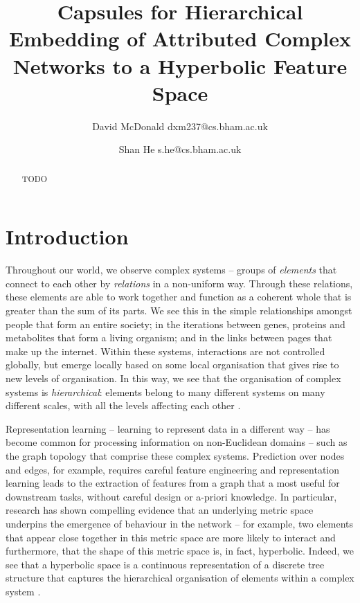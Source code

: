 \documentclass{IEEEtran}
\title{Capsules for Hierarchical Embedding of Attributed Complex Networks to a Hyperbolic Feature Space}
\author{David McDonald dxm237@cs.bham.ac.uk \and Shan He s.he@cs.bham.ac.uk}
\date{}
\begin{document}
	
	\maketitle
	
	\begin{abstract}
		TODO
	\end{abstract}
	
	\section{Introduction}
	
	Throughout our world, we observe complex systems -- groups of \textit{elements} that connect to each other by \textit{relations} in a non-uniform way. 
	Through these relations, these elements are able to work together and function as a coherent whole that is greater than the sum of its parts.
	We see this in the simple relationships amongst people that form an entire society; in the iterations between genes, proteins and metabolites that form a living organism; and in the links between pages that make up the internet.
	Within these systems, interactions are not controlled globally, but emerge locally based on some local organisation that gives rise to new levels of organisation.
	In this way, we see that the organisation of complex systems is \textit{hierarchical}: elements belong to many different systems on many different scales, with all the levels affecting each other \cite{barabasi1999emergence}.   
	
	Representation learning -- learning to represent data in a different way -- has become common for processing information on non-Euclidean domains -- such as the graph topology that comprise these complex systems.  
	Prediction over nodes and edges, for example, requires careful feature engineering \cite{grover2016node2vec} and representation learning leads to the extraction of features from a graph that a most useful for downstream tasks, without careful design or a-priori knowledge.
	In particular, research has shown compelling evidence that an underlying metric space underpins the emergence of behaviour in the network -- for example, two elements that appear close together in this metric space are more likely to interact \cite{grover2016node2vec,alanis2016efficient,alanis2016manifold} and furthermore, that the shape of this metric space is, in fact, hyperbolic.
	Indeed, we see that a hyperbolic space is a continuous representation of a discrete tree structure that captures the hierarchical organisation of elements within a complex system \cite{krioukov2010hyperbolic}.
	
\end{document}
